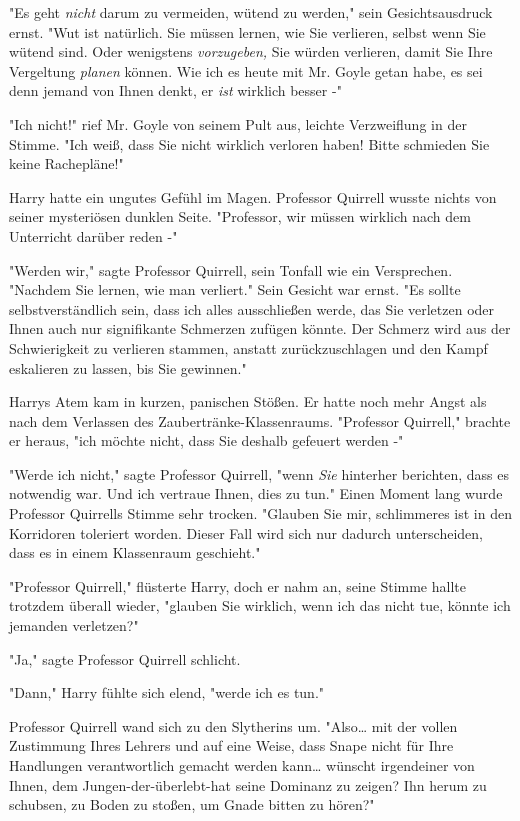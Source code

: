 {"Es geht \emph{nicht} darum zu vermeiden, wütend zu werden," sein Gesichtsausdruck ernst. "Wut ist natürlich. Sie müssen lernen, wie Sie verlieren, selbst wenn Sie wütend sind. Oder wenigstens \emph{vorzugeben,} Sie würden verlieren, damit Sie Ihre Vergeltung \emph{planen} können. Wie ich es heute mit Mr. Goyle getan habe, es sei denn jemand von Ihnen denkt, er \emph{ist} wirklich besser -"

"Ich nicht!" rief Mr. Goyle von seinem Pult aus, leichte Verzweiflung in der Stimme. "Ich weiß, dass Sie nicht wirklich verloren haben! Bitte schmieden Sie keine Rachepläne!"

Harry hatte ein ungutes Gefühl im Magen. Professor Quirrell wusste nichts von seiner mysteriösen dunklen Seite. "Professor, wir müssen wirklich nach dem Unterricht darüber reden -"

"Werden wir," sagte Professor Quirrell, sein Tonfall wie ein Versprechen. "Nachdem Sie lernen, wie man verliert." Sein Gesicht war ernst. "Es sollte selbstverständlich sein, dass ich alles ausschließen werde, das Sie verletzen oder Ihnen auch nur signifikante Schmerzen zufügen könnte. Der Schmerz wird aus der Schwierigkeit zu verlieren stammen, anstatt zurückzuschlagen und den Kampf eskalieren zu lassen, bis Sie gewinnen."

Harrys Atem kam in kurzen, panischen Stößen. Er hatte noch mehr Angst als nach dem Verlassen des Zaubertränke-Klassenraums. "Professor Quirrell," brachte er heraus, "ich möchte nicht, dass Sie deshalb gefeuert werden -"

"Werde ich nicht," sagte Professor Quirrell, "wenn \emph{Sie} hinterher berichten, dass es notwendig war. Und ich vertraue Ihnen, dies zu tun." Einen Moment lang wurde Professor Quirrells Stimme sehr trocken. "Glauben Sie mir, schlimmeres ist in den Korridoren toleriert worden. Dieser Fall wird sich nur dadurch unterscheiden, dass es in einem Klassenraum geschieht."

"Professor Quirrell," flüsterte Harry, doch er nahm an, seine Stimme hallte trotzdem überall wieder, "glauben Sie wirklich, wenn ich das nicht tue, könnte ich jemanden verletzen?"

"Ja," sagte Professor Quirrell schlicht.

"Dann," Harry fühlte sich elend, "werde ich es tun."

Professor Quirrell wand sich zu den Slytherins um. "Also… mit der vollen Zustimmung Ihres Lehrers und auf eine Weise, dass Snape nicht für Ihre Handlungen verantwortlich gemacht werden kann… wünscht irgendeiner von Ihnen, dem Jungen-der-überlebt-hat seine Dominanz zu zeigen? Ihn herum zu schubsen, zu Boden zu stoßen, um Gnade bitten zu hören?"

}
